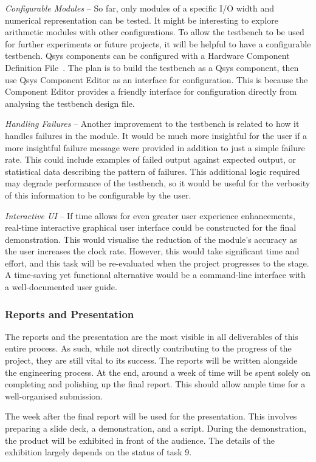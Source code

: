 \textit{Configurable Modules} --
So far, only modules of a specific I/O width and numerical representation can
be tested.
It might be interesting to explore arithmetic modules with other configurations.
To allow the testbench to be used for further experiments or future projects,
it will be helpful to have a configurable testbench.
Qsys components can be configured with a Hardware Component Definition
File~\cite{Altera5}.
The plan is to build the testbench as a Qsys component, then use Qsys Component
Editor as an interface for configuration.
This is because the Component Editor provides a friendly interface for
configuration directly from analysing the testbench design file.

\textit{Handling Failures} --
Another improvement to the testbench is related to how it handles failures
in the module.
It would be much more insightful for the user if a more insightful failure
message were provided in addition to just a simple failure rate.
This could include examples of failed output against expected output,
or statistical data describing the pattern of failures.
This additional logic required may degrade performance of the testbench,
so it would be useful for the verbosity of this information to be configurable
by the user.

\textit{Interactive UI} --
If time allows for even greater user experience enhancements, real-time
interactive graphical user interface could be constructed for the final
demonstration.
This would visualise the reduction of the module's accuracy as the user
increases the clock rate.
However, this would take significant time and effort, and this task will
be re-evaluated when the project progresses to the stage.
A time-saving yet functional alternative would be a command-line interface
with a well-documented user guide.

\subsubsection{\textbf{Reports and Presentation}}
The reports and the presentation are the most visible in all deliverables of
this entire process.
As such, while not directly contributing to the progress of the project,
they are still vital to its success.
The reports will be written alongside the engineering process.
At the end, around a week of time will be spent solely on completing and
polishing up the final report.
This should allow ample time for a well-organised submission.

The week after the final report will be used for the presentation.
This involves preparing a slide deck, a demonstration, and a script.
During the demonstration, the product will be exhibited in front of the
audience.
The details of the exhibition largely depends on the status of task 9.

